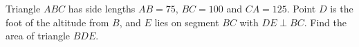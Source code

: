 Triangle $ABC$ has side lengths $AB=75$, $BC=100$ and $CA=125$. Point $D$ is the foot of the altitude from $B$, and $E$ lies on segment $BC$ with $DE\perp BC$. Find the area of triangle $BDE$.
